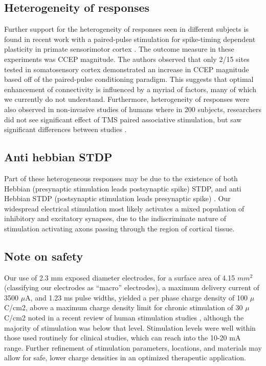 \subsection{Heterogeneity of responses}
Further support for the heterogeneity of responses seen in different subjects is found in recent work with a paired-pulse stimulation for spike-timing dependent plasticity in primate sensorimotor cortex \cite{Seeman2017}. The outcome measure in these experiments was CCEP magnitude. The authors observed that only 2/15 sites tested in somatosensory cortex demonstrated an increase in CCEP magnitude based off of the paired-pulse conditioning paradigm. This suggests that optimal enhancement of connectivity is influenced by a myriad of factors, many of which we currently do not understand. Furthermore, heterogeneity of responses were also observed in non-invasive studies of humans where in 200 subjects, researchers did not see significant effect of TMS paired associative stimulation, but saw significant differences between studies \cite{Lahr2016}. 

\subsection{Anti hebbian STDP}
Part of these heterogeneous responses may be due to the existence of both Hebbian (presynaptic stimulation leads postsynaptic spike) STDP, and anti Hebbian STDP (postsynaptic stimulation leads presynaptic spike) \cite{Letzkus2006,Feldman2012}. Our widespread electrical stimulation most likely activates a mixed population of inhibitory and excitatory synapses, due to the indiscriminate nature of stimulation activating axons passing through the region of cortical tissue. 

\subsection{Note on safety}
Our use of 2.3 mm exposed diameter electrodes, for a surface area of 4.15 $mm^2$ (classifying our electrodes as “macro” electrodes), a maximum delivery current of 3500 $\mu$A, and 1.23 ms pulse widths, yielded a per phase charge density of 100 $\mu$C/cm2, above a maximum charge density limit for chronic stimulation of 30 $\mu$C/cm2 noted in a recent review of human stimulation studies \cite{Cogan2016b}, although the majority of stimulation was below that level. Stimulation levels were well within those used routinely for clinical studies, which can reach into the 10-20 mA range. Further refinement of stimulation parameters, locations, and materials may allow for safe, lower charge densities in an optimized therapeutic application. 

